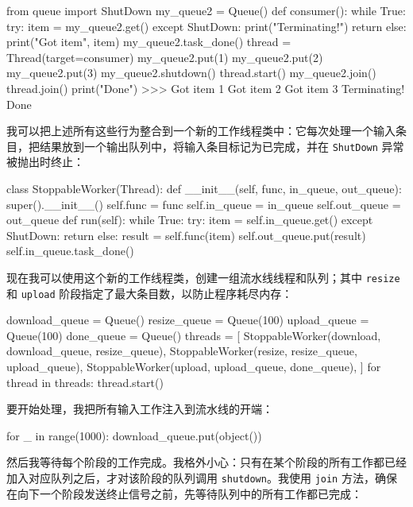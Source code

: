 \begin{codebox}[python]
from queue import ShutDown
my_queue2 = Queue()
def consumer():
    while True:
        try:
            item = my_queue2.get()
        except ShutDown:
            print("Terminating!")
            return
        else:
            print("Got item", item)
            my_queue2.task_done()
thread = Thread(target=consumer)
my_queue2.put(1)
my_queue2.put(2)
my_queue2.put(3)
my_queue2.shutdown()
thread.start()
my_queue2.join()
thread.join()
print("Done")
>>>
Got item 1
Got item 2
Got item 3
Terminating!
Done
\end{codebox}

我可以把上述所有这些行为整合到一个新的工作线程类中：它每次处理一个输入条目，把结果放到一个输出队列中，将输入条目标记为已完成，并在 \texttt{ShutDown} 异常被抛出时终止：

\begin{codebox}[python]
class StoppableWorker(Thread):
    def __init__(self, func, in_queue, out_queue):
        super().__init__()
        self.func = func
        self.in_queue = in_queue
        self.out_queue = out_queue
    def run(self):
        while True:
            try:
                item = self.in_queue.get()
            except ShutDown:
                return
            else:
                result = self.func(item)
                self.out_queue.put(result)
                self.in_queue.task_done()
\end{codebox}

现在我可以使用这个新的工作线程类，创建一组流水线线程和队列；其中 \texttt{resize} 和 \texttt{upload} 阶段指定了最大条目数，以防止程序耗尽内存：

\begin{codebox}[python]
download_queue = Queue()
resize_queue = Queue(100)
upload_queue = Queue(100)
done_queue = Queue()
threads = [
    StoppableWorker(download, download_queue, resize_queue),
    StoppableWorker(resize, resize_queue, upload_queue),
    StoppableWorker(upload, upload_queue, done_queue),
]
for thread in threads:
    thread.start()
\end{codebox}

要开始处理，我把所有输入工作注入到流水线的开端：

\begin{codebox}[python]
for _ in range(1000):
    download_queue.put(object())
\end{codebox}

然后我等待每个阶段的工作完成。我格外小心：只有在某个阶段的所有工作都已经加入对应队列之后，才对该阶段的队列调用 \texttt{shutdown}。我使用 \texttt{join} 方法，确保在向下一个阶段发送终止信号之前，先等待队列中的所有工作都已完成：

